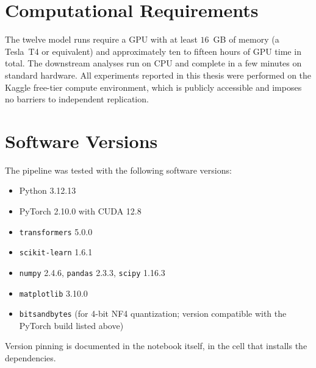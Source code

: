 \section{Computational Requirements}
\label{sec:app-compute}

The twelve model runs require a GPU with at least $16$~GB of memory 
(a Tesla~T4 or equivalent) and approximately ten to fifteen hours of 
GPU time in total. The downstream analyses run on CPU and complete 
in a few minutes on standard hardware. All experiments reported in 
this thesis were performed on the Kaggle free-tier compute 
environment, which is publicly accessible and imposes no barriers to 
independent replication.

\section{Software Versions}
\label{sec:app-versions}

The pipeline was tested with the following software versions:

\begin{itemize}
    \item Python 3.12.13
    \item PyTorch 2.10.0 with CUDA 12.8
    \item \texttt{transformers} 5.0.0
    \item \texttt{scikit-learn} 1.6.1
    \item \texttt{numpy} 2.4.6, \texttt{pandas} 2.3.3, \texttt{scipy} 1.16.3
    \item \texttt{matplotlib} 3.10.0
    \item \texttt{bitsandbytes} (for 4-bit NF4 quantization; version compatible with the PyTorch build listed above)
\end{itemize}

Version pinning is documented in the notebook itself, in the cell 
that installs the dependencies.